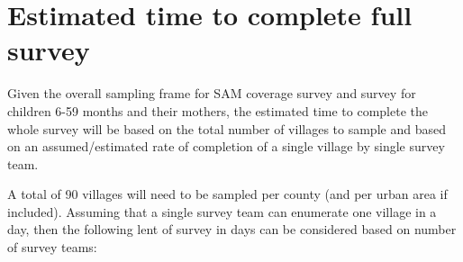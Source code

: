 \documentclass[12pt,a4paper]{book}
\theoremstyle{definition}
\theoremstyle{definition}
\theoremstyle{definition}
\theoremstyle{remark}
\begin{document}
\hypertarget{estimated-time-to-complete-full-survey}{%
\section{Estimated time to complete full
survey}\label{estimated-time-to-complete-full-survey}}

Given the overall sampling frame for SAM coverage survey and survey for
children 6-59 months and their mothers, the estimated time to complete
the whole survey will be based on the total number of villages to sample
and based on an assumed/estimated rate of completion of a single village
by single survey team.

A total of 90 villages will need to be sampled per county (and per urban
area if included). Assuming that a single survey team can enumerate one
village in a day, then the following lent of survey in days can be
considered based on number of survey teams:

~
\end{document}
